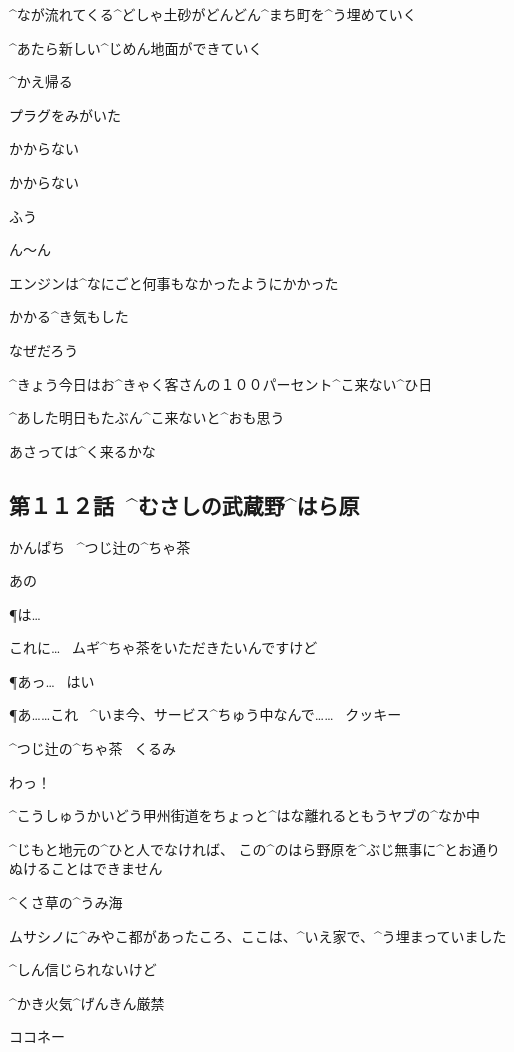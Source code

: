 \A ^{なが}{流}れてくる^{どしゃ}{土砂}がどんどん^{まち}{町}を^{う}{埋}めていく

\A ^{あたら}{新}しい^{じめん}{地面}ができていく

\page
\A ^{かえ}{帰}る

\page
\A プラグをみがいた

\A かからない

\A かからない

\A ふう

\page
\A ん〜ん

\page[16]
\A エンジンは^{なにごと}{何事}もなかったようにかかった

\A かかる^{き}{気}もした

\A なぜだろう

\page
\A ^{きょう}{今日}はお^{きゃく}{客}さんの１００パーセント^{こ}{来}ない^{ひ}{日}

\page
\A ^{あした}{明日}もたぶん^{こ}{来}ないと^{おも}{思}う

\A あさっては^{く}{来}るかな


\subsection{第１１２話\ ^{むさしの}{武蔵野}^{はら}{原}}

\page[22]
\Sign かんぱち
\ ^{つじ}{辻}の^{ちゃ}{茶}

\K あの

\P は…

\K これに…
\ ムギ^{ちゃ}{茶}をいただきたいんですけど

\P あっ…
\ はい

\page
\P あ……これ
\ ^{いま}{今}、サービス^{ちゅう}{中}なんで……
\ クッキー

\Sign ^{つじ}{辻}の^{ちゃ}{茶}
\ くるみ

\K わっ！

\page
\K ^{こうしゅうかいどう}{甲州街道}をちょっと^{はな}{離}れるともうヤブの^{なか}{中}

\K ^{じもと}{地元}の^{ひと}{人}でなければ、
この^{のはら}{野原}を^{ぶじ}{無事}に^{とお}{通}りぬけることはできません

\page
\K ^{くさ}{草}の^{うみ}{海}

\K ムサシノに^{みやこ}{都}があったころ、ここは、^{いえ}{家}で、^{う}{埋}まっていました

\K ^{しん}{信}じられないけど

\page
\Sign ^{かき}{火気}^{げんきん}{厳禁}

\SH ココネー

